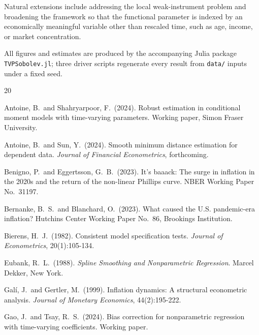 \documentclass[12pt]{article}
\begin{document}
Natural extensions include addressing the local weak-instrument problem and broadening the framework so that the functional parameter is indexed by an economically meaningful variable other than rescaled time, such as age, income, or market concentration.

All figures and estimates are produced by the accompanying Julia package \texttt{TVPSobolev.jl}; three driver scripts regenerate every result from \texttt{data/} inputs under a fixed seed.


\begin{thebibliography}{20}

Antoine, B.\ and Shahryarpoor, F.\ (2024).
\newblock Robust estimation in conditional moment models with time-varying parameters.
\newblock Working paper, Simon Fraser University.

Antoine, B.\ and Sun, Y.\ (2024).
\newblock Smooth minimum distance estimation for dependent data.
\newblock \emph{Journal of Financial Econometrics}, forthcoming.

Benigno, P.\ and Eggertsson, G.~B.\ (2023).
\newblock It's baaack: The surge in inflation in the 2020s and the return of the non-linear {P}hillips curve.
\newblock NBER Working Paper No.\ 31197.

Bernanke, B.~S.\ and Blanchard, O.\ (2023).
\newblock What caused the {U.S.} pandemic-era inflation?
\newblock Hutchins Center Working Paper No.\ 86, Brookings Institution.

Bierens, H.~J.\ (1982).
\newblock Consistent model specification tests.
\newblock \emph{Journal of Econometrics}, 20(1):105-134.

Eubank, R.~L.\ (1988).
\newblock \emph{Spline Smoothing and Nonparametric Regression}.
\newblock Marcel Dekker, New York.

Gal\'{i}, J.\ and Gertler, M.\ (1999).
\newblock Inflation dynamics: A structural econometric analysis.
\newblock \emph{Journal of Monetary Economics}, 44(2):195-222.

Gao, J.\ and Tsay, R.~S.\ (2024).
\newblock Bias correction for nonparametric regression with time-varying coefficients.
\newblock Working paper.


\end{thebibliography}
\end{document}
